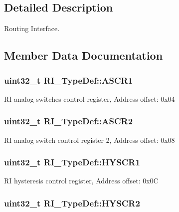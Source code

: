 \subsection{Detailed Description}
Routing Interface. 

\subsection{Member Data Documentation}
\hypertarget{struct_r_i___type_def_a0e22b5b4cb660a876e185c9c2225f45f}{
\subsubsection[{A\-S\-C\-R1}]{ uint32\-\_\-t R\-I\-\_\-\-Type\-Def\-::\-A\-S\-C\-R1}}\label{struct_r_i___type_def_a0e22b5b4cb660a876e185c9c2225f45f}
R\-I analog switches control register, Address offset\-: 0x04 \hypertarget{struct_r_i___type_def_aeef72e9f5e1d864dde15d636219ac58d}{
\subsubsection[{A\-S\-C\-R2}]{ uint32\-\_\-t R\-I\-\_\-\-Type\-Def\-::\-A\-S\-C\-R2}}\label{struct_r_i___type_def_aeef72e9f5e1d864dde15d636219ac58d}
R\-I analog switch control register 2, Address offset\-: 0x08 \hypertarget{struct_r_i___type_def_a807f9b63b7cb1357354fb8f7e07bfbb0}{
\subsubsection[{H\-Y\-S\-C\-R1}]{ uint32\-\_\-t R\-I\-\_\-\-Type\-Def\-::\-H\-Y\-S\-C\-R1}}\label{struct_r_i___type_def_a807f9b63b7cb1357354fb8f7e07bfbb0}
R\-I hysteresis control register, Address offset\-: 0x0\-C \hypertarget{struct_r_i___type_def_a2b8a23d4df42b1d0ca4d902e1f13a61d}{
\subsubsection[{H\-Y\-S\-C\-R2}]{ uint32\-\_\-t R\-I\-\_\-\-Type\-Def\-::\-H\-Y\-S\-C\-R2}}\label{struct_r_i___type_def_a2b8a23d4df42b1d0ca4d902e1f13a61d}
